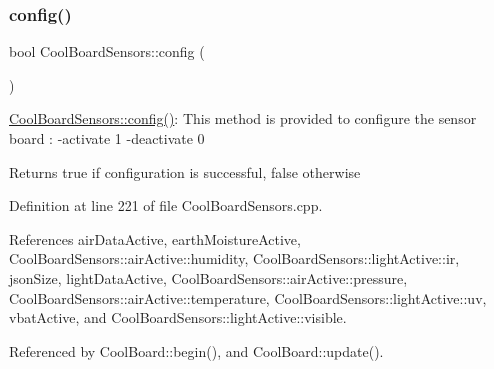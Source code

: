 \subsubsection{\texorpdfstring{config()}{config()}}
{\footnotesize\ttfamily bool Cool\+Board\+Sensors\+::config (\begin{DoxyParamCaption}{ }\end{DoxyParamCaption})}

\hyperlink{classCoolBoardSensors_a9a218895c5423375c33c08f2c56fb23a}{Cool\+Board\+Sensors\+::config()}\+: This method is provided to configure the sensor board \+: -\/activate 1 -\/deactivate 0

\begin{DoxyReturn}{Returns}
true if configuration is successful, false otherwise 
\end{DoxyReturn}


Definition at line 221 of file Cool\+Board\+Sensors.\+cpp.



References air\+Data\+Active, earth\+Moisture\+Active, Cool\+Board\+Sensors\+::air\+Active\+::humidity, Cool\+Board\+Sensors\+::light\+Active\+::ir, json\+Size, light\+Data\+Active, Cool\+Board\+Sensors\+::air\+Active\+::pressure, Cool\+Board\+Sensors\+::air\+Active\+::temperature, Cool\+Board\+Sensors\+::light\+Active\+::uv, vbat\+Active, and Cool\+Board\+Sensors\+::light\+Active\+::visible.



Referenced by Cool\+Board\+::begin(), and Cool\+Board\+::update().



